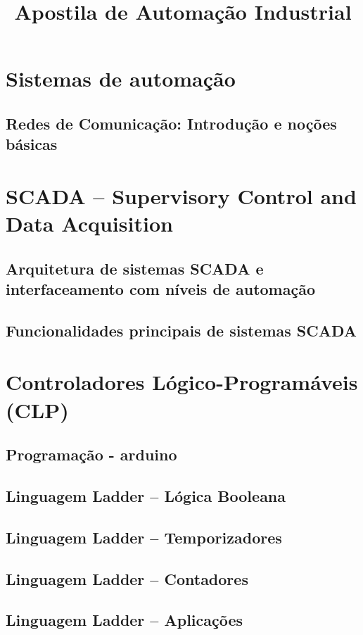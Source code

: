 \documentclass[12pt,oneside]{report}
\title{Apostila de Automação Industrial}
\begin{document}
\maketitle
\tableofcontents
\chapter{Sistemas de automação}


\section{Redes de Comunicação: Introdução e noções básicas}
\chapter{SCADA -- Supervisory Control and Data Acquisition}
\section{Arquitetura de sistemas SCADA e interfaceamento com níveis de automação}
\section{Funcionalidades principais de sistemas SCADA}
\chapter{Controladores Lógico-Programáveis (CLP)}
\section{Programação - arduino}
\section{Linguagem Ladder – Lógica Booleana}
\section{Linguagem Ladder – Temporizadores}
\section{Linguagem Ladder – Contadores}
\section{Linguagem Ladder – Aplicações}
\end{document}
